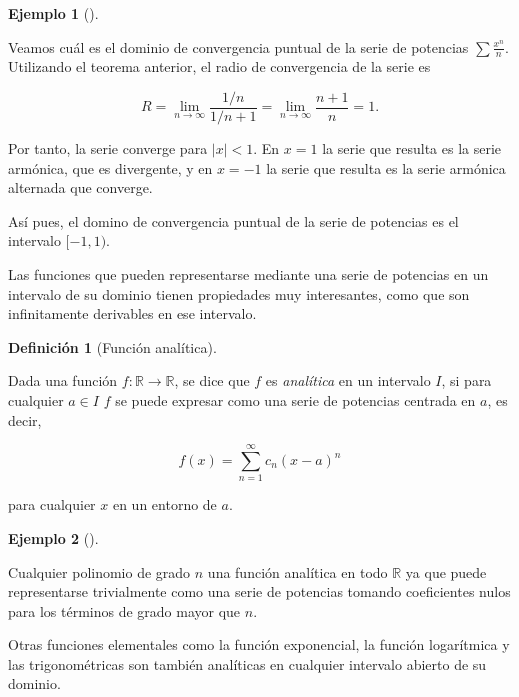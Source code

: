 \documentclass[
  a4paper,
]{scrreport}
\theoremstyle{plain}
\theoremstyle{plain}
\theoremstyle{definition}
\newtheorem{definition}{Definición}[chapter]
\theoremstyle{plain}
\theoremstyle{definition}
\newtheorem{example}{Ejemplo}[chapter]
\theoremstyle{remark}
\begin{document}
\leavevmode{}%
\begin{example}[]\label{exm-radio-convergencia-razon}

Veamos cuál es el dominio de convergencia puntual de la serie de
potencias \(\sum \frac{x^n}{n}\). Utilizando el teorema anterior, el
radio de convergencia de la serie es

\[
R = \lim_{n\to\infty} \frac{1/n}{1/n+1} = \lim_{n\to\infty} \frac{n+1}{n} = 1.
\]

Por tanto, la serie converge para \(|x|<1\). En \(x=1\) la serie que
resulta es la serie armónica, que es divergente, y en \(x=-1\) la serie
que resulta es la serie armónica alternada que converge.

Así pues, el domino de convergencia puntual de la serie de potencias es
el intervalo \([-1,1)\).

\end{example}

Las funciones que pueden representarse mediante una serie de potencias
en un intervalo de su dominio tienen propiedades muy interesantes, como
que son infinitamente derivables en ese intervalo.

\leavevmode{}%
\begin{definition}[Función analítica]\label{def-funcion-analitica}

Dada una función \(f:\mathbb{R}\to\mathbb{R}\), se dice que \(f\) es
\emph{analítica} en un intervalo \(I\), si para cualquier \(a\in I\)
\(f\) se puede expresar como una serie de potencias centrada en \(a\),
es decir,

\[ f(x) = \sum_{n=1}^\infty c_n(x-a)^n\]

para cualquier \(x\) en un entorno de \(a\).

\end{definition}

\leavevmode{}%
\begin{example}[]\label{exm-funciones-analiticas}

Cualquier polinomio de grado \(n\) una función analítica en todo
\(\mathbb{R}\) ya que puede representarse trivialmente como una serie de
potencias tomando coeficientes nulos para los términos de grado mayor
que \(n\).

Otras funciones elementales como la función exponencial, la función
logarítmica y las trigonométricas son también analíticas en cualquier
intervalo abierto de su dominio.

\end{example}
\end{document}
